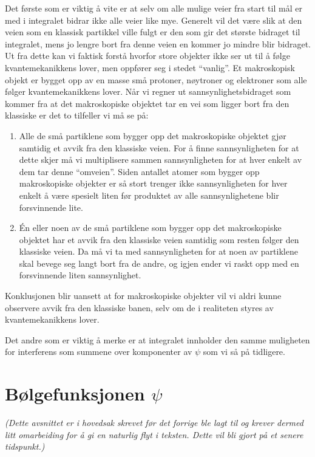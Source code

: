 Det første som er viktig å vite er at selv om alle mulige veier fra start til mål er med i integralet bidrar ikke alle veier like mye. Generelt vil det være slik at den veien som en klassisk partikkel ville fulgt er den som gir det største bidraget til integralet, mens jo lengre bort fra denne veien en kommer jo mindre blir bidraget. Ut fra dette kan vi faktisk forstå hvorfor store objekter ikke ser ut til å følge kvantemekanikkens lover, men oppfører seg i stedet ``vanlig''. Et makroskopisk objekt er bygget opp av en masse små protoner, nøytroner og elektroner som alle følger kvantemekanikkens lover. Når vi regner ut sannsynlighetsbidraget som kommer fra at det makroskopiske objektet tar en vei som ligger bort fra den klassiske er det to tilfeller vi må se på:
\begin{enumerate}
\item
Alle de små partiklene som bygger opp det makroskopiske objektet gjør samtidig et avvik fra den klassiske veien. For å finne sannsynligheten for at dette skjer må vi multiplisere sammen sannsynligheten for at hver enkelt av dem tar denne ``omveien''. Siden antallet atomer som bygger opp makroskopiske objekter er så stort trenger ikke sannsynligheten for hver enkelt å være spesielt liten før produktet av alle sannsynlighetene blir forsvinnende lite.
\item
\'En eller noen av de små partiklene som bygger opp det makroskopiske objektet har et avvik fra den klassiske veien samtidig som resten følger den klassiske veien. Da må vi ta med sannsynligheten for at noen av partiklene skal bevege seg langt bort fra de andre, og igjen ender vi raskt opp med en forsvinnende liten sannsynlighet.
\end{enumerate}
Konklusjonen blir uansett at for makroskopiske objekter vil vi aldri kunne observere avvik fra den klassiske banen, selv om de i realiteten styres av kvantemekanikkens lover.

Det andre som er viktig å merke er at integralet innholder den samme muligheten for interferens som summene over komponenter av $\psi$ som vi så på tidligere. 

\section{Bølgefunksjonen $\psi$}
\label{sec:kvante:psi}
\emph{(Dette avsnittet er i hovedsak skrevet før det forrige ble lagt til og krever dermed litt omarbeiding for å gi en naturlig flyt i teksten. Dette vil bli gjort på et senere tidspunkt.)} \\
\vspace{12pt}

